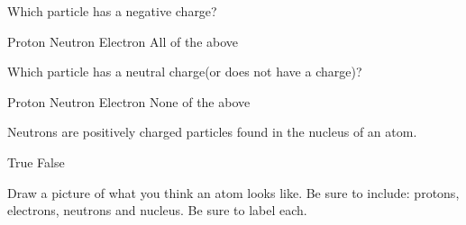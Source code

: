 \documentclass{exam}
\begin{document}
\begin{center}
\end{center}


\begin{questions}
    


\question Which particle has a negative charge?
\begin{checkboxes}
    \choice Proton  
    \choice Neutron  
    \choice Electron  
    \choice All of the above  
\end{checkboxes}  

\question Which particle has a neutral charge(or does not have a charge)?
\begin{checkboxes}
    \choice Proton  
    \choice Neutron  
    \choice Electron  
    \choice None of the above  
\end{checkboxes}  




\question[2] Neutrons are positively charged particles found in the nucleus of an atom.  
\begin{checkboxes}
    \choice True
    \choice False
\end{checkboxes}



\question Draw a picture of what you think an atom looks like. Be sure to include: protons, electrons, neutrons and nucleus. Be sure to label each.  

\makeemptybox{3in}

\end{questions}
\end{document}
